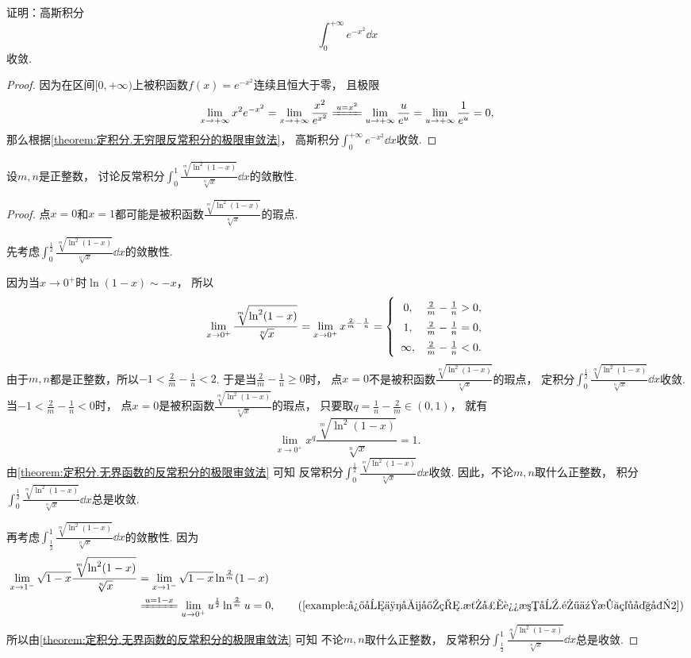 \begin{example}\label{example:定积分.高斯积分的收敛性}
证明：高斯积分\[
	\int_0^{+\infty} e^{-x^2} \dd{x}
\]收敛.
\begin{proof}
因为在区间\([0,+\infty)\)上被积函数\(f(x) = e^{-x^2}\)连续且恒大于零，
且极限\[
	\lim_{x\to+\infty} x^2 e^{-x^2}
	= \lim_{x\to+\infty} \frac{x^2}{e^{x^2}}
	\xlongequal{u=x^2} \lim_{u\to+\infty} \frac{u}{e^u}
	= \lim_{u\to+\infty} \frac{1}{e^u}
	= 0,
\]
那么根据\cref{theorem:定积分.无穷限反常积分的极限审敛法}，
高斯积分\(\int_0^{+\infty} e^{-x^2} \dd{x}\)收敛.
\end{proof}
\end{example}

\begin{example}
设\(m,n\)是正整数，
讨论反常积分\(\int_0^1 \frac{\sqrt[m]{\ln^2(1-x)}}{\sqrt[n]{x}} \dd{x}\)的敛散性.
\begin{proof}
点\(x=0\)和\(x=1\)都可能是被积函数\(\frac{\sqrt[m]{\ln^2(1-x)}}{\sqrt[n]{x}}\)的瑕点.

先考虑\(\int_0^{\frac12} \frac{\sqrt[m]{\ln^2(1-x)}}{\sqrt[n]{x}} \dd{x}\)的敛散性.

因为当\(x\to0^+\)时\(\ln(1-x) \sim -x\)，
所以\[
	\lim_{x\to0^+} \frac{\sqrt[m]{\ln^2(1-x)}}{\sqrt[n]{x}}
	= \lim_{x\to0^+} x^{\frac2m-\frac1n}
	= \left\{ \def\arraystretch{1.5} \begin{array}{cl}
		0, & \frac2m-\frac1n>0, \\
		1, & \frac2m-\frac1n=0, \\
		\infty, & \frac2m-\frac1n<0.
	\end{array} \right.
\]
由于\(m,n\)都是正整数，所以\(-1<\frac2m-\frac1n<2\).
于是当\(\frac2m-\frac1n\geq0\)时，
点\(x=0\)不是被积函数\(\frac{\sqrt[m]{\ln^2(1-x)}}{\sqrt[n]{x}}\)的瑕点，
定积分\(\int_0^{\frac12} \frac{\sqrt[m]{\ln^2(1-x)}}{\sqrt[n]{x}} \dd{x}\)收敛.
当\(-1<\frac2m-\frac1n<0\)时，
点\(x=0\)是被积函数\(\frac{\sqrt[m]{\ln^2(1-x)}}{\sqrt[n]{x}}\)的瑕点，
只要取\(q=\frac1n-\frac2m\in(0,1)\)，
就有\[
	\lim_{x\to0^+} x^q \frac{\sqrt[m]{\ln^2(1-x)}}{\sqrt[n]{x}} = 1.
\]
由\cref{theorem:定积分.无界函数的反常积分的极限审敛法} 可知
反常积分\(\int_0^{\frac12} \frac{\sqrt[m]{\ln^2(1-x)}}{\sqrt[n]{x}} \dd{x}\)收敛.
因此，不论\(m,n\)取什么正整数，
积分\(\int_0^{\frac12} \frac{\sqrt[m]{\ln^2(1-x)}}{\sqrt[n]{x}} \dd{x}\)总是收敛.

再考虑\(\int_{\frac12}^1 \frac{\sqrt[m]{\ln^2(1-x)}}{\sqrt[n]{x}} \dd{x}\)的敛散性.
因为\begin{align*}
	\lim_{x\to1^-} \sqrt{1-x} \frac{\sqrt[m]{\ln^2(1-x)}}{\sqrt[n]{x}}
	&= \lim_{x\to1^-} \sqrt{1-x} \ln^{\frac2m}(1-x) \\
	&\xlongequal{u=1-x}
	\lim_{u\to0^+} u^{\frac12} \ln^{\frac2m} u
	= 0, \tag{\cref{example:微分中值定理.洛必达法则.零乘无穷大型2}}
\end{align*}
所以由\cref{theorem:定积分.无界函数的反常积分的极限审敛法} 可知
不论\(m,n\)取什么正整数，
反常积分\(\int_{\frac12}^1 \frac{\sqrt[m]{\ln^2(1-x)}}{\sqrt[n]{x}} \dd{x}\)总是收敛.
\end{proof}
\end{example}
